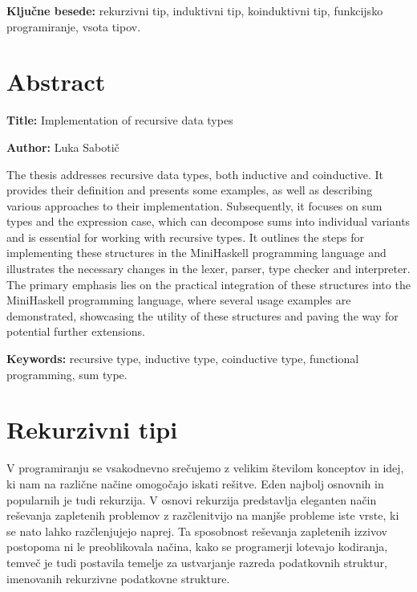 \documentclass[12pt,a4paper,openany]{book}
\newcommand{\tkeywords}{rekurzivni tip, induktivni tip, koinduktivni tip, funkcijsko programiranje, vsota tipov}
\newcommand{\tkeywordsEn}{recursive type, inductive type, coinductive type, functional programming, sum type}
\newcommand{\ttitleEn}{Implementation of recursive data types}
\newcommand{\tauthor}{Luka Sabotič}
\begin{document}
\bigskip

\noindent\textbf{Ključne besede:} \tkeywords.

{}
\chapter*{Abstract}

\noindent\textbf{Title:} \ttitleEn
\bigskip

\noindent\textbf{Author:} \tauthor
\bigskip

\noindent The thesis addresses recursive data types, both inductive and coinductive. It provides their definition and presents some examples, as well as 
describing various approaches to their implementation. Subsequently, it focuses on sum types and the expression case, which can 
decompose sums into individual variants and is essential for working with recursive types. It outlines the steps for implementing these 
structures in the MiniHaskell programming language and illustrates the necessary changes in the lexer, parser, type checker and interpreter. 
The primary emphasis lies on the practical integration of these structures into the MiniHaskell programming language, where several usage 
examples are demonstrated, showcasing the utility of these structures and paving the way for potential further extensions.
\bigskip

\noindent\textbf{Keywords:} \tkeywordsEn.



\newpage

\mainmatter
\setcounter{page}{1}
\chapter{Rekurzivni tipi}
V programiranju se vsakodnevno srečujemo z velikim številom konceptov in idej, ki nam na različne načine omogočajo iskati rešitve. Eden najbolj osnovnih in popularnih je tudi rekurzija.
V osnovi rekurzija predstavlja eleganten način reševanja zapletenih problemov z razčlenitvijo na manjše probleme iste vrste, ki se nato lahko razčlenjujejo naprej. Ta sposobnost reševanja zapletenih izzivov 
postopoma ni le preoblikovala načina, kako se programerji lotevajo kodiranja, temveč je tudi postavila temelje za ustvarjanje razreda podatkovnih struktur, imenovanih rekurzivne podatkovne strukture.
\end{document}
